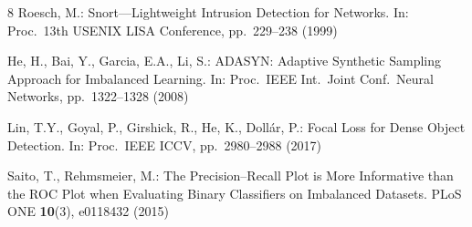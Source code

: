 \documentclass[runningheads]{llncs}
\begin{document}
\begin{thebibliography}{8}
Roesch, M.: Snort---Lightweight Intrusion Detection for Networks. In: Proc.\ 13th USENIX LISA Conference, pp.\ 229--238 (1999)

He, H., Bai, Y., Garcia, E.A., Li, S.: ADASYN: Adaptive Synthetic Sampling Approach for Imbalanced Learning. In: Proc.\ IEEE Int.\ Joint Conf.\ Neural Networks, pp.\ 1322--1328 (2008)

Lin, T.Y., Goyal, P., Girshick, R., He, K., Doll\'{a}r, P.: Focal Loss for Dense Object Detection. In: Proc.\ IEEE ICCV, pp.\ 2980--2988 (2017)

Saito, T., Rehmsmeier, M.: The Precision--Recall Plot is More Informative than the ROC Plot when Evaluating Binary Classifiers on Imbalanced Datasets. PLoS ONE \textbf{10}(3), e0118432 (2015)

\end{thebibliography}
\end{document}
